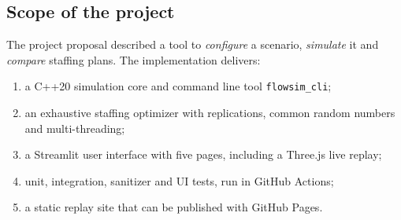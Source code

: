 \documentclass[11pt,a4paper]{article}
\newcommand{\code}[1]{\texttt{#1}}
\begin{document}
\subsection{Scope of the project}
The project proposal described a tool to \emph{configure} a scenario, \emph{simulate} it and \emph{compare} staffing
plans. The implementation delivers:
\begin{enumerate}
  \item a C++20 simulation core and command line tool \code{flowsim\_cli};
  \item an exhaustive staffing optimizer with replications, common random numbers and multi-threading;
  \item a Streamlit user interface with five pages, including a Three.js live replay;
  \item unit, integration, sanitizer and UI tests, run in GitHub Actions;
  \item a static replay site that can be published with GitHub Pages.
\end{enumerate}

\end{document}
